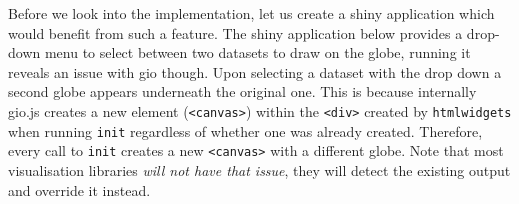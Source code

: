 \documentclass[
]{krantz}
\begin{document}
Before we look into the implementation, let us create a shiny application which would benefit from such a feature. The shiny application below provides a drop-down menu to select between two datasets to draw on the globe, running it reveals an issue with gio though. Upon selecting a dataset with the drop down a second globe appears underneath the original one. This is because internally gio.js creates a new element (\texttt{\textless{}canvas\textgreater{}}) within the \texttt{\textless{}div\textgreater{}} created by \texttt{htmlwidgets} when running \texttt{init} regardless of whether one was already created. Therefore, every call to \texttt{init} creates a new \texttt{\textless{}canvas\textgreater{}} with a different globe. Note that most visualisation libraries \emph{will not have that issue}, they will detect the existing output and override it instead.
\end{document}
